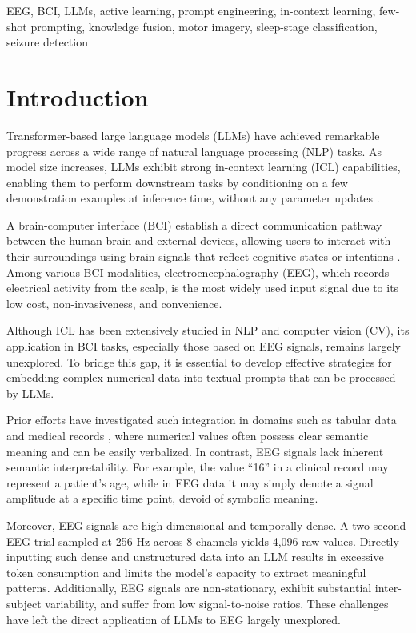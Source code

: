 \documentclass[journal,twocolumn]{IEEEtran}
\begin{document}
\begin{IEEEkeywords}
EEG, BCI, LLMs, active learning, prompt engineering, in-context learning, few-shot prompting, knowledge fusion, motor imagery, sleep-stage classification, seizure detection
\end{IEEEkeywords}

\IEEEpeerreviewmaketitle

\section{Introduction}

Transformer-based large language models (LLMs) \cite{vaswani2017attention} have achieved remarkable progress across a wide range of natural language processing (NLP) tasks. As model size increases, LLMs exhibit strong in-context learning (ICL) capabilities, enabling them to perform downstream tasks by conditioning on a few demonstration examples at inference time, without any parameter updates \cite{brown2020language}.

A brain-computer interface (BCI) \cite{Lance2012, Wolpaw2002} establish a direct communication pathway between the human brain and external devices, allowing users to interact with their surroundings using brain signals that reflect cognitive states or intentions \cite{he2019transfer}. Among various BCI modalities, electroencephalography (EEG), which records electrical activity from the scalp, is the most widely used input signal due to its low cost, non-invasiveness, and convenience.

Although ICL has been extensively studied in NLP and computer vision (CV), its application in BCI tasks, especially those based on EEG signals, remains largely unexplored. To bridge this gap, it is essential to develop effective strategies for embedding complex numerical data into textual prompts that can be processed by LLMs.

Prior efforts have investigated such integration in domains such as tabular data \cite{hegselmann2023tabllm} and medical records \cite{liu2023large}, where numerical values often possess clear semantic meaning and can be easily verbalized. In contrast, EEG signals lack inherent semantic interpretability. For example, the value “16” in a clinical record may represent a patient’s age, while in EEG data it may simply denote a signal amplitude at a specific time point, devoid of symbolic meaning.

Moreover, EEG signals are high-dimensional and temporally dense. A two-second EEG trial sampled at 256 Hz across 8 channels yields 4,096 raw values. Directly inputting such dense and unstructured data into an LLM results in excessive token consumption and limits the model’s capacity to extract meaningful patterns. Additionally, EEG signals are non-stationary, exhibit substantial inter-subject variability, and suffer from low signal-to-noise ratios. These challenges have left the direct application of LLMs to EEG largely unexplored.
\end{document}
